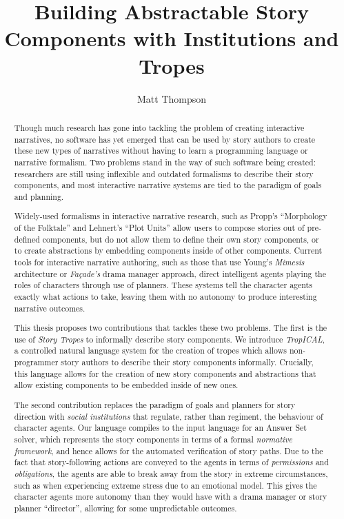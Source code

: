 \documentclass[11pt]{report}
\title{Building Abstractable Story Components with Institutions and Tropes}
\author{Matt Thompson}
\newif\ifdraft
\begin{document}
\maketitle

\ifdraft
\clearpage
\listoftodos[List of Corrections]
\clearpage
\fi
\clearpage
\tableofcontents
\clearpage



\begin{abstract}
  Though much research has gone into tackling the problem of creating
  interactive narratives, no software has yet emerged that can be used by
  story authors to create these new types of narratives without having to learn
  a programming language or narrative formalism. Two problems stand in the way of such software being created: researchers are
  still using inflexible and outdated formalisms to describe their story
  components, and most interactive narrative systems are tied to the paradigm of
  goals and planning.

  Widely-used formalisms in interactive narrative research, such as Propp's
  ``Morphology of the Folktale'' and Lehnert's
  ``Plot Units'' allow users to compose stories out of
  pre-defined components, but do not allow them to define their own story
  components, or to create abstractions by embedding components inside of other
  components. Current tools for interactive narrative
  authoring, such as those that use Young's \emph{Mimesis} architecture or
  \emph{Fa\c{c}ade's} drama manager approach, direct intelligent agents playing
  the roles of characters through use of planners. These systems tell the character
  agents exactly what actions to take, leaving them with no autonomy to produce
  interesting narrative outcomes.

  This thesis proposes two contributions that tackles these two problems. The
  first is the use of \emph{Story Tropes} to informally describe story
  components. We introduce \emph{TropICAL}, a controlled natural language system
  for the creation of tropes which
  allows non-programmer story authors to describe their story components informally. Crucially, this
  language allows for the creation of new story components and abstractions
  that allow existing components to be embedded inside of new ones.

  The second contribution replaces the paradigm of goals and planners for story
  direction with \emph{social institutions} that regulate,
  rather than regiment, the behaviour of character agents. Our language
  compiles to the input language for an Answer Set solver, which represents the
  story components in terms of a formal \emph{normative framework}, and hence allows for
  the automated verification of story paths. Due to the fact that
  story-following actions are conveyed to the agents in terms of
  \emph{permissions} and \emph{obligations}, the agents are able to break away
  from the story in extreme circumstances, such as when experiencing extreme
  stress due to an emotional model. This gives the character agents more
  autonomy than they would have with a drama manager or story planner
  ``director'', allowing for some unpredictable outcomes.


\end{abstract}
\end{document}

